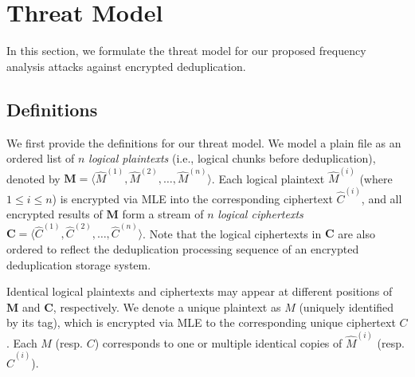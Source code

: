 \documentclass[bachelor]{thesis-uestc}
\begin{document}
\chapter{Threat Model}
\label{sec:threat}

In this section, we formulate the threat model for our proposed frequency
analysis attacks against encrypted deduplication.  

\section{Definitions}

We first provide the definitions for our threat model. We model a plain file
as an ordered list of $n$ {\em logical plaintexts} (i.e., logical chunks
before deduplication), denoted by $\mathbf{M} = \langle \hat{M}^{(1)},
\hat{M}^{(2)}, \ldots, \hat{M}^{(n)}\rangle$.  Each logical plaintext
$\hat{M}^{(i)}$ (where $1\le i\le n$) is encrypted via MLE into the
corresponding ciphertext $\hat{C}^{(i)}$, and all encrypted results of
$\mathbf{M}$ form a stream of $n$ {\em logical ciphertexts} $\mathbf{C} =
\langle \hat{C}^{(1)}, \hat{C}^{(2)}, \ldots, \hat{C}^{(n)} \rangle$.  Note
that the logical ciphertexts in $\mathbf{C}$ are also ordered to reflect the
deduplication processing sequence of an encrypted deduplication storage
system.  

Identical logical plaintexts and ciphertexts may appear at different positions
of $\mathbf{M}$ and $\mathbf{C}$, respectively.  We denote a unique plaintext
as $M$ (uniquely identified by its tag), which is encrypted via MLE to the
corresponding unique ciphertext $C$.  Each $M$ (resp. $C$) corresponds to one
or multiple identical copies of $\hat{M}^{(i)}$ (resp. $\hat{C}^{(i)}$).  


\end{document}
